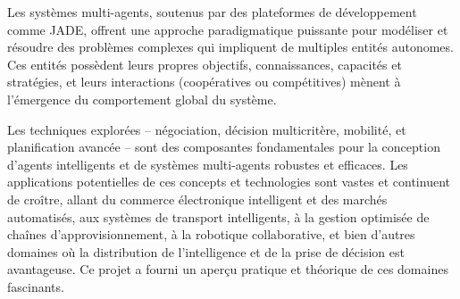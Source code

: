 \documentclass[a4paper,12pt]{report}
\begin{document}
Les systèmes multi-agents, soutenus par des plateformes de développement comme JADE, offrent une approche paradigmatique puissante pour modéliser et résoudre des problèmes complexes qui impliquent de multiples entités autonomes. Ces entités possèdent leurs propres objectifs, connaissances, capacités et stratégies, et leurs interactions (coopératives ou compétitives) mènent à l'émergence du comportement global du système.

Les techniques explorées – négociation, décision multicritère, mobilité, et planification avancée – sont des composantes fondamentales pour la conception d'agents intelligents et de systèmes multi-agents robustes et efficaces. Les applications potentielles de ces concepts et technologies sont vastes et continuent de croître, allant du commerce électronique intelligent et des marchés automatisés, aux systèmes de transport intelligents, à la gestion optimisée de chaînes d'approvisionnement, à la robotique collaborative, et bien d'autres domaines où la distribution de l'intelligence et de la prise de décision est avantageuse. Ce projet a fourni un aperçu pratique et théorique de ces domaines fascinants.
\end{document}
